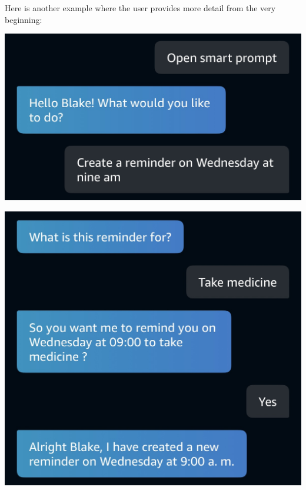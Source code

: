 \documentclass[11pt, oneside]{article}
\begin{document}
Here is another example where the user provides more detail from the very beginning:
\begin{center}
  \includegraphics[width=\linewidth * 3/4]{images/createReminder2a.jpg}
\end{center}
\begin{center}
  \includegraphics[width=\linewidth * 3/4]{images/createReminder2b.jpg}
\end{center}
\end{document}
